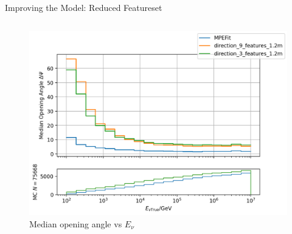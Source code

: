 \begin{frame}{Improving the Model: Reduced Featureset}
\begin{columns}
\begin{column}{.65\textwidth}
{\begin{figure}
                    \includegraphics[width=.95\textwidth]{media/3_vs_9.png}
                    \caption*{\small Median opening angle vs $E_\nu$}
                \end{figure}}
        \end{column}
    \end{columns}
\end{frame}
